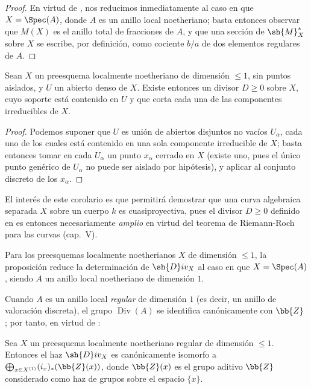 \begin{proof}
En virtud de , nos reducimos inmediatamente al caso en que $X=\Spec(A)$, donde $A$ es un anillo local noetheriano;
basta entonces observar que $M(X)$ es el anillo total de fracciones de $A$, y que una sección de $\sh{M}^*_X$ sobre $X$ se escribe, por definición, como cociente $b/a$ de dos elementos regulares de $A$.
\end{proof}

\begin{corollary}[21.9.7]
\label{IV.21.9.7}
Sean $X$ un preesquema localmente noetheriano de dimensión $\leq1$, sin puntos aislados, y $U$ un abierto denso de $X$.
Existe entonces un divisor $D\geq0$ sobre $X$, cuyo soporte está contenido en $U$ y que corta cada una de las componentes irreducibles de $X$.
\end{corollary}

\begin{proof}
Podemos suponer que $U$ es unión de abiertos disjuntos no vacíos $U_\alpha$, cada uno de los cuales está contenido en una sola componente irreducible de $X$;
basta entonces tomar en cada $U_\alpha$ un punto $x_\alpha$ cerrado en $X$ (existe uno, pues el único punto genérico de $U_\alpha$ no puede ser aislado por hipótesis), y aplicar  al conjunto discreto de los $x_\alpha$.
\end{proof}

El interés de este corolario es que permitirá demostrar que una curva algebraica separada $X$ sobre un cuerpo $k$ es cuasiproyectiva, pues el divisor $D\geq0$ definido en  es entonces necesariamente \emph{amplio} en virtud del teorema de Riemann-Roch para las curvas (cap.~V).

\begin{env}[21.9.8]
\label{IV.21.9.8}
Para los preesquemas localmente noetherianos $X$ de dimensión $\leq1$, la proposición  reduce la determinación de $\sh{D}iv_X$ al caso en que $X=\Spec(A)$, siendo $A$ un anillo local noetheriano de dimensión $1$.

Cuando $A$ es un anillo local \emph{regular} de dimensión $1$ (es decir, un anillo de valoración discreta), el grupo $\operatorname{Div}(A)$ se identifica canónicamente con $\bb{Z}$ ;
por tanto, en virtud de :
\end{env}

\begin{proposition}[21.9.9]
\label{IV.21.9.9}
Sea $X$ un preesquema localmente noetheriano \textup{regular} de dimensión $\leq1$.
Entonces el haz $\sh{D}iv_X$ es canónicamente isomorfo a $\bigoplus_{x\in X^{(1)}}(i_x)_*(\bb{Z}(x))$, donde $\bb{Z}(x)$ es el grupo aditivo $\bb{Z}$ considerado como haz de grupos sobre el espacio $\{x\}$.
\end{proposition}

